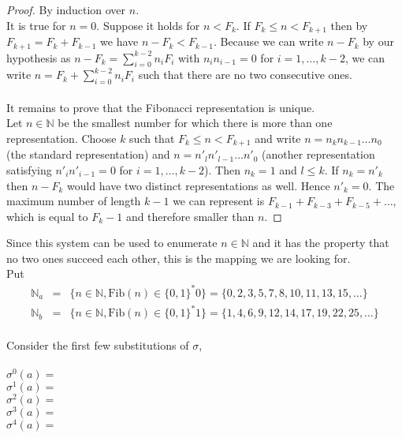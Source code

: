\documentclass{article}
\begin{document}
\begin{proof} By induction over $n$.\\
It is true for $n = 0$. Suppose it holds for $n < F_k$. If 
$F_k \le n < F_{k + 1}$ then by $F_{k + 1} = F_k + F_{k - 1}$ we have 
$n - F_k < F_{k - 1}$. Because we can write $n - F_k$ by our hypothesis as
$n - F_k = \sum_{i = 0}^{k - 2} n_i F_i$ with $n_i n_{i - 1} = 0$ for
$i = 1, \ldots, k - 2$, we can write $n = F_k + \sum_{i = 0}^{k - 2} n_i F_i$ 
such that there are no two consecutive ones.\\
\\
It remains to prove that the Fibonacci representation is unique.\\
Let $n \in \mathbb{N}$ be the smallest number for which there is more than one
representation. Choose $k$ such that $F_k \le n < F_{k + 1}$ and write
$n = n_k n_{k - 1} \ldots n_0$ (the standard representation) and
$n = n'_l n'_{l - 1} \ldots n'_0$ (another representation satisfying 
$n'_i n'_{i - 1} = 0$ for $i = 1, \ldots, k - 2$). Then $n_k = 1$ and $l \le k$.
If $n_k = n'_k$ then $n - F_k$ would have two distinct representations as well.
Hence $n'_k = 0$.
The maximum number of length $k - 1$ we can represent is 
$F_{k - 1} + F_{k - 3} + F_{k - 5} + \ldots$, which is equal to $F_k - 1$ and 
therefore smaller than $n$. 
\end{proof}

Since this system can be used to enumerate $n \in \mathbb{N}$ and it has the
property that no two ones succeed each other, this is the mapping we are
looking for.\\
Put
\begin{eqnarray*}
  \mathbb{N}_a &=& \{n \in \mathbb{N}, \mathrm{Fib}(n) \in \{0, 1\}^* 0\} = 
                   \{0, 2, 3, 5, 7, 8, 10, 11, 13, 15, \ldots\}\\
  \mathbb{N}_b &=& \{n \in \mathbb{N}, \mathrm{Fib}(n) \in \{0, 1\}^* 1\} =
                   \{1, 4, 6, 9, 12, 14, 17, 19, 22, 25, \ldots\}
\end{eqnarray*}
\\
Consider the first few substitutions of $\sigma$,\\
\\
$\sigma^0(a) =$ \\
$\sigma^1(a) =$ \\
$\sigma^2(a) =$ \\
$\sigma^3(a) =$ \\
$\sigma^4(a) =$ 
\end{document}
